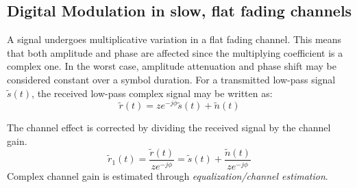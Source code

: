 \subsection{Digital Modulation in slow, flat fading channels}
A signal undergoes multiplicative variation in a flat fading channel. This means that both amplitude and phase are affected since the multiplying coefficient is a complex one. In the worst case, amplitude attenuation and phase shift may be considered constant over a symbol duration. For a transmitted low-pass signal \(\tilde{s}(t)\), the received low-pass complex signal may be written as:
\[
	\tilde{r}(t) = ze^{-j\phi}\tilde{s}(t) + \tilde{n}(t)
\]
\begin{mathDef}
\end{mathDef}
The channel effect is corrected by dividing the received signal by the channel gain.
\[
	\tilde{r}_1(t) = \frac{\tilde{r}(t)}{ze^{-j\phi}} = \tilde{s}(t) + \frac{\tilde{n}(t)}{ze^{-j\phi}}
\]
Complex channel gain is estimated through \emph{equalization/channel estimation}.
